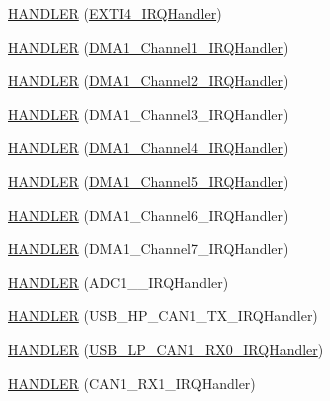 \begin{DoxyCompactItemize}
\item 
\hyperlink{group___p_i_o_s_ga9b52b435e765f418d0b20373ebf7d3de}{\-H\-A\-N\-D\-L\-E\-R} (\hyperlink{group___p_i_o_s___e_x_t_i_ga290cb997018c8d85d4b965b4a242842f}{\-E\-X\-T\-I4\-\_\-\-I\-R\-Q\-Handler})
\item 
\hyperlink{group___p_i_o_s_ga9e2d769f4c4643f6f859b5ef04d6d8df}{\-H\-A\-N\-D\-L\-E\-R} (\hyperlink{group___pip_xtreme_gabd49de55f82b1a0be3edaaf34dbe4b14}{\-D\-M\-A1\-\_\-\-Channel1\-\_\-\-I\-R\-Q\-Handler})
\item 
\hyperlink{group___p_i_o_s_gadf12505dd17ab67ac8f1ef1acd5722b2}{\-H\-A\-N\-D\-L\-E\-R} (\hyperlink{group___copter_control_ga4055152a9bfe1072e00247cc351276ba}{\-D\-M\-A1\-\_\-\-Channel2\-\_\-\-I\-R\-Q\-Handler})
\item 
\hyperlink{group___p_i_o_s_gad3ca30cca745b268027f50e556588fa5}{\-H\-A\-N\-D\-L\-E\-R} (\-D\-M\-A1\-\_\-\-Channel3\-\_\-\-I\-R\-Q\-Handler)
\item 
\hyperlink{group___p_i_o_s_ga1d58ca450480446a2c488dc53001f493}{\-H\-A\-N\-D\-L\-E\-R} (\hyperlink{group___copter_control_ga9cdc63af1166aec768f87546a48bec8d}{\-D\-M\-A1\-\_\-\-Channel4\-\_\-\-I\-R\-Q\-Handler})
\item 
\hyperlink{group___p_i_o_s_ga3d879eb7c368ae3e534bfcdbff172109}{\-H\-A\-N\-D\-L\-E\-R} (\hyperlink{group___pip_xtreme_ga8e3a6d7ba4b5da3ec8decb912bd80943}{\-D\-M\-A1\-\_\-\-Channel5\-\_\-\-I\-R\-Q\-Handler})
\item 
\hyperlink{group___p_i_o_s_gade543c66fd60c4e916129eafa94a335c}{\-H\-A\-N\-D\-L\-E\-R} (\-D\-M\-A1\-\_\-\-Channel6\-\_\-\-I\-R\-Q\-Handler)
\item 
\hyperlink{group___p_i_o_s_ga6c9ed7169954db94ef46ab39ce85d6f1}{\-H\-A\-N\-D\-L\-E\-R} (\-D\-M\-A1\-\_\-\-Channel7\-\_\-\-I\-R\-Q\-Handler)
\item 
\hyperlink{group___p_i_o_s_ga26b03512a0e5375eee51ef8d4b03c748}{\-H\-A\-N\-D\-L\-E\-R} (\-A\-D\-C1\-\_\-\_\-\-I\-R\-Q\-Handler)
\item 
\hyperlink{group___p_i_o_s_gae24dca6ba50882215c910dcf23a3ef10}{\-H\-A\-N\-D\-L\-E\-R} (\-U\-S\-B\-\_\-\-H\-P\-\_\-\-C\-A\-N1\-\_\-\-T\-X\-\_\-\-I\-R\-Q\-Handler)
\item 
\hyperlink{group___p_i_o_s_ga46ab0ef22d9e34e51ecb3f08ab2a3a8b}{\-H\-A\-N\-D\-L\-E\-R} (\hyperlink{_s_t_m32_f30x_2pios__usb__hid__istr_8c_af57bde854fa2b396f29664995a502b19}{\-U\-S\-B\-\_\-\-L\-P\-\_\-\-C\-A\-N1\-\_\-\-R\-X0\-\_\-\-I\-R\-Q\-Handler})
\item 
\hyperlink{group___p_i_o_s_gae1b19bec9df0a07c35af20be43d4afa4}{\-H\-A\-N\-D\-L\-E\-R} (\-C\-A\-N1\-\_\-\-R\-X1\-\_\-\-I\-R\-Q\-Handler)

\end{DoxyCompactItemize}
